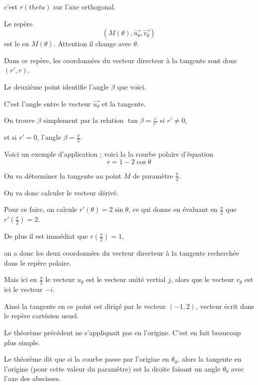 c'est $r(theta)$ sur l'axe orthogonal.

Le repère 
$$(M(\theta),\overrightarrow{u_\theta},\overrightarrow{v_\theta})$$
est le  
en $M(\theta)$. Attention il change avec $\theta$.

Dans ce repère, les coordonnées du vecteur directeur à la tangente sont donc $(r',r)$.

\change

Le deuxième point identifie l'angle $\beta$ que voici.

C'est l'angle entre le vecteur $\overrightarrow{u_\theta}$ et la tangente.

On trouve $\beta$ simplement par la relation
$\tan \beta = \frac{r}{r'}$  si $r'\neq 0$, 

et si $r'=0$, l'angle $\beta = \frac{\pi}{2}$.



\diapo

Voici un exemple d'application ; 
voici la la courbe polaire d'équation $$r=1-2\cos\theta$$

\change
On va déterminer 
la tangente au point $M$ de paramètre $\frac{\pi}{2}$.

\change
On va donc calculer le vecteur dérivé.

\change
Pour ce faire, on calcule $r'(\theta)=2\sin\theta$, ce qui donne en évaluant en 
$\frac{\pi}{2}$ que $r'(\frac{\pi}{2})=2$.

\change
De plus il est immédiat que $r(\frac{\pi}{2})=1$, 

\change
on a donc les deux coordonnées du vecteur directeur à la tangente 
recherchée dans le repère polaire.

\change
Mais ici en $\frac\pi2$ le vecteur $u_\theta$ est le vecteur unité vertial $j$,
alors que le vecteur $v_\theta$ est ici le vecteur $-i$.

Ainsi la tangente en ce point est dirigé par le vecteur $(-1,2)$, vecteur écrit dans le repère
cartésien usuel.


\diapo

Le théorème précédent ne s'appliquait pas en l'origine.  C'est en fait beaucoup plus simple.

Le théorème dit que si la courbe passe par l'origine en $\theta_0$, 
alors la tangente en l'origine (pour cette valeur du paramètre) est la droite 
faisant un angle $\theta_0$ avec l'axe des abscisses.

